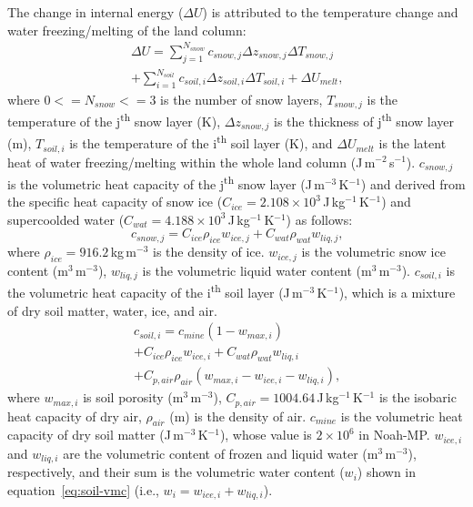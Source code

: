 \documentclass[essd]{copernicus}
\begin{document}
The change in internal energy (\(\Delta U\)) is attributed to the temperature
change and water freezing/melting of the land column:
\begin{multline}
    \Delta U = \sum_{j=1}^{N_{snow}} c_{snow,j} \Delta z_{snow,j} \Delta
    T_{snow,j} \\
    + \sum_{i=1}^{N_{soil}} c_{soil,i} \Delta z_{soil,i} \Delta T_{soil,i}
    + \Delta U_{melt} \text{,}
\end{multline}
where \(0<=N_{snow}<=3\) is the number of snow layers, \(T_{snow,j}\) is the
temperature of the j\textsuperscript{th} snow layer (K), \(\Delta z_{snow,j}\)
is the thickness of j\textsuperscript{th} snow layer (m), \(T_{soil,i}\) is the
temperature of the i\textsuperscript{th} soil layer (K), and \(\Delta U_{melt}\)
is the latent heat of water freezing/melting within the whole land column
(J\,m$^{-2}$\,s$^{-1}$). \(c_{snow,j}\) is the volumetric heat capacity of the
j\textsuperscript{th} snow layer (J\,m$^{-3}$\,K$^{-1}$) and derived from the
specific heat capacity of snow ice (\(C_{ice} = 2.108 \times
10^3\)\,J\,kg$^{-1}$\,K$^{-1}$) and supercoolded water (\(C_{wat} = 4.188 \times
10^3\)\,J\,kg$^{-1}$\,K$^{-1}$) as follows:
\begin{equation}
    c_{snow,j} = C_{ice} \rho_{ice} w_{ice,j} + C_{wat} \rho_{wat} w_{liq,j}
    \text{,}
\end{equation}
where \(\rho_{ice} = 916.2\)\,kg\,m$^{-3}$ is the density of ice. $w_{ice,j}$ is
the volumetric snow ice content (m$^{3}$\,m$^{-3}$), \(w_{liq,j}\) is the
volumetric liquid water content (m$^{3}$\,m$^{-3}$). \(c_{soil,i}\) is the
volumetric heat capacity of the i\textsuperscript{th} soil layer
(J\,m$^{-3}$\,K$^{-1}$), which is a mixture of dry soil matter, water, ice, and
air.
\begin{multline}
    c_{soil,i} = c_{mine} (1 - w_{max,i}) \\
    + C_{ice} \rho_{ice} w_{ice,i} + C_{wat} \rho_{wat} w_{liq,i} \\
    + C_{p,air} \rho_{air} (w_{max,i} - w_{ice,i} - w_{liq,i}) \text{,}
\end{multline}
where \(w_{max,i}\) is soil porosity (m$^{3}$\,m$^{-3}$), $C_{p,air} =
1004.64$\,J\,kg$^{-1}$\,K$^{-1}$ is the isobaric heat capacity of dry air,
\(\rho_{air}\) (m) is the density of air. \(c_{mine}\) is the volumetric heat
capacity of dry soil matter (J\,m$^{-3}$\,K$^{-1}$), whose value is
\(2\times10^6\) in Noah-MP. \(w_{ice,i}\) and \(w_{liq,i}\) are the volumetric
content of frozen and liquid water (m$^{3}$\,m$^{-3}$), respectively, and their
sum is the volumetric water content (\(w_{i}\)) shown in
equation~\eqref{eq:soil-vmc} (i.e., \(w_{i} = w_{ice,i} + w_{liq,i}\)).
\end{document}
